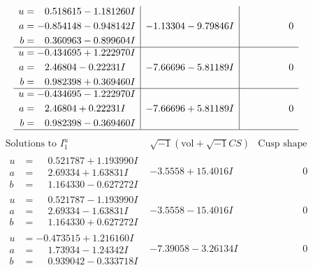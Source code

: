 \documentclass[1p]{elsarticle_modified}
\theoremstyle{definition}
\newcommand{\I}{\sqrt{-1}}
\begin{document}
$$\begin{array}{c|c|c}
\begin{aligned}
u &= \phantom{-}0.518615 - 1.181260 I \\
a &= -0.854148 - 0.948142 I \\
b &= \phantom{-}0.360963 - 0.899604 I\end{aligned}
 & -1.13304 - 9.79846 I & \phantom{-0.000000 } 0 \\ \hline\begin{aligned}
u &= -0.434695 + 1.222970 I \\
a &= \phantom{-}2.46804 - 0.22231 I \\
b &= \phantom{-}0.982398 + 0.369460 I\end{aligned}
 & -7.66696 - 5.81189 I & \phantom{-0.000000 } 0 \\ \hline\begin{aligned}
u &= -0.434695 - 1.222970 I \\
a &= \phantom{-}2.46804 + 0.22231 I \\
b &= \phantom{-}0.982398 - 0.369460 I\end{aligned}
 & -7.66696 + 5.81189 I & \phantom{-0.000000 } 0\\
 \hline 
 \end{array}$$\newpage$$\begin{array}{c|c|c}  
\text{Solutions to }I^u_{1}& \I (\text{vol} + \sqrt{-1}CS) & \text{Cusp shape}\\
 \hline 
\begin{aligned}
u &= \phantom{-}0.521787 + 1.193990 I \\
a &= \phantom{-}2.69334 + 1.63831 I \\
b &= \phantom{-}1.164330 - 0.627272 I\end{aligned}
 & -3.5558 + 15.4016 I & \phantom{-0.000000 } 0 \\ \hline\begin{aligned}
u &= \phantom{-}0.521787 - 1.193990 I \\
a &= \phantom{-}2.69334 - 1.63831 I \\
b &= \phantom{-}1.164330 + 0.627272 I\end{aligned}
 & -3.5558 - 15.4016 I & \phantom{-0.000000 } 0 \\ \hline\begin{aligned}
u &= -0.473515 + 1.216160 I \\
a &= \phantom{-}1.73934 - 1.24342 I \\
b &= \phantom{-}0.939042 - 0.333718 I\end{aligned}
 & -7.39058 - 3.26134 I & \phantom{-0.000000 } 0 \\ \hline\begin{aligned}

\end{aligned}
\end{array}$$
\end{document}
